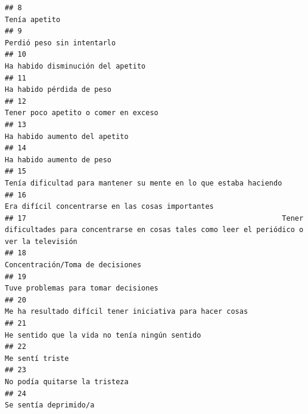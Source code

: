 \documentclass[
]{article}
\begin{document}
\begin{verbatim}
## 8                                                                                                                                              Tenía apetito
## 9                                                                                                                                 Perdió peso sin intentarlo
## 10                                                                                                                         Ha habido disminución del apetito
## 11                                                                                                                                 Ha habido pérdida de peso
## 12                                                                                                                      Tener poco apetito o comer en exceso
## 13                                                                                                                             Ha habido aumento del apetito
## 14                                                                                                                                 Ha habido aumento de peso
## 15                                                                                         Tenía dificultad para mantener su mente en lo que estaba haciendo
## 16                                                                                                         Era difícil concentrarse en las cosas importantes
## 17                                                            Tener dificultades para concentrarse en cosas tales como leer el periódico o ver la televisión
## 18                                                                                                                          Concentración/Toma de decisiones
## 19                                                                                                                      Tuve problemas para tomar decisiones
## 20                                                                                                 Me ha resultado difícil tener iniciativa para hacer cosas
## 21                                                                                                            He sentido que la vida no tenía ningún sentido
## 22                                                                                                                                           Me sentí triste
## 23                                                                                                                             No podía quitarse la tristeza
## 24                                                                                                                                     Se sentía deprimido/a

\end{verbatim}
\end{document}
